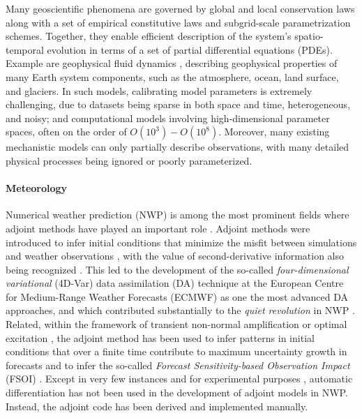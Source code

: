 Many geoscientific phenomena are governed by global and local conservation laws along with a set of empirical constitutive laws and subgrid-scale parametrization schemes. 
Together, they enable efficient description of the system's spatio-temporal evolution in terms of a set of partial differential equations (PDEs).
Example are geophysical fluid dynamics \cite{Vallis:2016kv}, describing geophysical properties of many Earth system components, such as the atmosphere, ocean, land surface, and glaciers.
In such models, calibrating model parameters is extremely challenging, due to datasets being sparse in both space and time, heterogeneous, and noisy; and computational models involving high-dimensional parameter spaces, often on the order of $O(10^3) - O(10^8)$.
Moreover, many existing mechanistic models can only partially describe observations, with many detailed physical processes being ignored or poorly parameterized. 



\paragraph{Meteorology}

Numerical weather prediction (NWP) is among the most prominent fields where adjoint methods have played an important role \cite{Errico_1997}. 
Adjoint methods were introduced to infer initial conditions that minimize the misfit between simulations and weather observations \cite{Talagrand.1987,Courtier.1987}, with the value of second-derivative information also being recognized \cite{Dimet.2002}. 
This led to the development of the so-called \textit{four-dimensional variational} (4D-Var) data assimilation (DA) technique \cite{Rabier.1992,Rabier:2000uu} at the European Centre for Medium-Range Weather Forecasts (ECMWF) as one the most advanced DA approaches, and which contributed substantially to the \textit{quiet revolution} in NWP \cite{Bauer.2015}.
Related, within the framework of transient non-normal amplification or optimal excitation \cite{Farrell.1988,Farrell:1996jx}, the adjoint method has been used to infer patterns in initial conditions that over a finite time contribute to maximum uncertainty growth in forecasts \cite{Palmer:1994br,Buizza:1995in} and to infer the so-called \textit{Forecast Sensitivity-based Observation Impact} (FSOI) \cite{Langland:2004jo}.
Except in very few instances and for experimental purposes \cite{Giering.2006}, automatic differentiation has not been used in the development of adjoint models in NWP.
Instead, the adjoint code has been derived and implemented manually.

